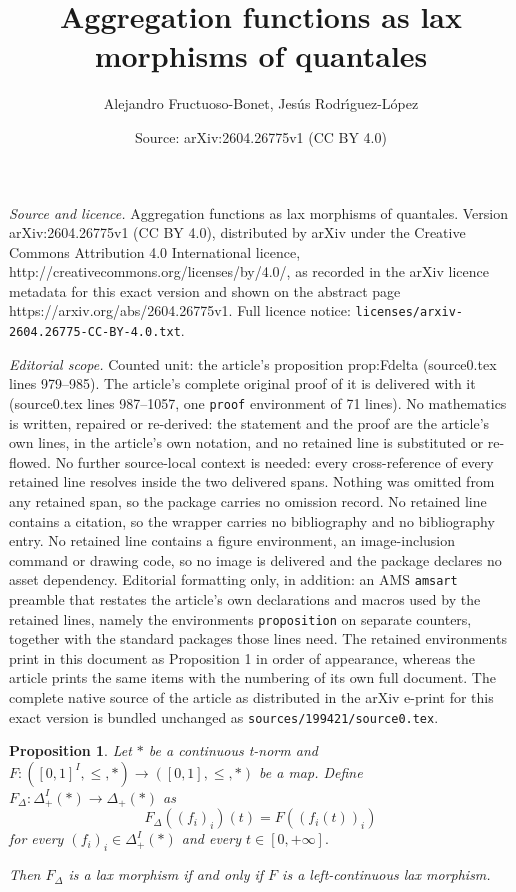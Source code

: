 \documentclass[10pt,a4paper]{amsart}
\title{Aggregation functions as lax morphisms of quantales}
\author{Alejandro Fructuoso-Bonet, Jes\'us Rodr\'{\i}guez-L\'opez}
\date{Source: arXiv:2604.26775v1 (CC BY 4.0)}
\newtheorem{proposition}{Proposition}
\begin{document}
\maketitle

\noindent\emph{Source and licence.} Aggregation functions as lax morphisms of quantales. Version arXiv:2604.26775v1 (CC BY 4.0), distributed by arXiv under the Creative Commons Attribution 4.0 International licence, http://creativecommons.org/licenses/by/4.0/, as recorded in the arXiv licence metadata for this exact version and shown on the abstract page https://arxiv.org/abs/2604.26775v1. Full licence notice: \texttt{licenses/arxiv-2604.26775-CC-BY-4.0.txt}.\par\smallskip

\noindent\textit{Editorial scope.} Counted unit: the article's proposition prop:Fdelta (source0.tex lines 979--985). The article's complete original proof of it is delivered with it (source0.tex lines 987--1057, one \texttt{proof} environment of 71 lines). No mathematics is written, repaired or re-derived: the statement and the proof are the article's own lines, in the article's own notation, and no retained line is substituted or re-flowed.  No further source-local context is needed: every cross-reference of every retained line resolves inside the two delivered spans.  Nothing was omitted from any retained span, so the package carries no omission record.  No retained line contains a citation, so the wrapper carries no bibliography and no bibliography entry.  No retained line contains a figure environment, an image-inclusion command or drawing code, so no image is delivered and the package declares no asset dependency.  Editorial formatting only, in addition: an AMS \texttt{amsart} preamble that restates the article's own declarations and macros used by the retained lines, namely the environments \texttt{proposition} on separate counters, together with the standard packages those lines need.  The retained environments print in this document as Proposition 1 in order of appearance, whereas the article prints the same items with the numbering of its own full document.  The complete native source of the article as distributed in the arXiv e-print for this exact version is bundled unchanged as \texttt{sources/199421/source0.tex}.
	\begin{proposition}\label{prop:Fdelta}
		Let $\ast$ be a continuous t-norm and $F:([0,1]^I,\leq,\ast)\to([0,1],\leq,\ast)$ be a map. Define  $F_\Delta:\Delta_+^I(\ast)\to \Delta_+(\ast)$ 
		as 
		$$F_\Delta((f_i)_i)(t)=F((f_i(t))_i)$$ for every $(f_i)_i\in \Delta_+^I(\ast)$ and every $t\in [0,+\infty].$
		
		Then $F_\Delta$ is a lax morphism if and only if $F$ is a left-continuous lax morphism.
	\end{proposition}
\end{document}
